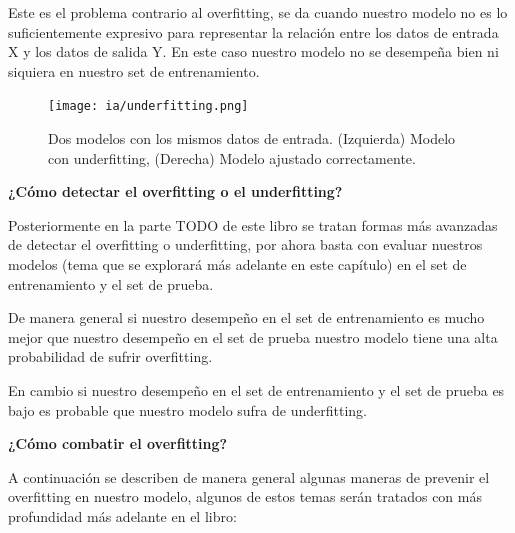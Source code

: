 \documentclass[11pt,fleqn]{book} %
\begin{document}
Este es el problema contrario al overfitting, se da cuando nuestro modelo no es lo suficientemente expresivo para representar la relación entre los datos de entrada X y los datos de salida Y. En este caso nuestro modelo no se desempeña bien ni siquiera en nuestro set de entrenamiento.

\begin{figure}[ht]
\centering\texttt{[image: ia/underfitting.png]}
\caption{Dos modelos con los mismos datos de entrada. (Izquierda) Modelo con underfitting, (Derecha) Modelo ajustado correctamente.}

\label{fig:underfitting} 
\end{figure}

\FloatBarrier
\textbf{¿Cómo detectar el overfitting o el underfitting?}

Posteriormente en la parte TODO de este libro se tratan formas más avanzadas de detectar el overfitting o underfitting, por ahora basta con evaluar nuestros modelos (tema que se explorará más adelante en este capítulo) en el set de entrenamiento y el set de prueba.

De manera general si nuestro desempeño en el set de entrenamiento es mucho mejor que nuestro desempeño en el set de prueba nuestro modelo tiene una alta probabilidad de sufrir overfitting.

En cambio si nuestro desempeño en el set de entrenamiento y el set de prueba es bajo es probable que nuestro modelo sufra de underfitting.

\textbf{¿Cómo combatir el overfitting?}

A continuación se describen de manera general algunas maneras de prevenir el overfitting en nuestro modelo, algunos de estos temas serán tratados con más profundidad más adelante en el libro:
\end{document}
